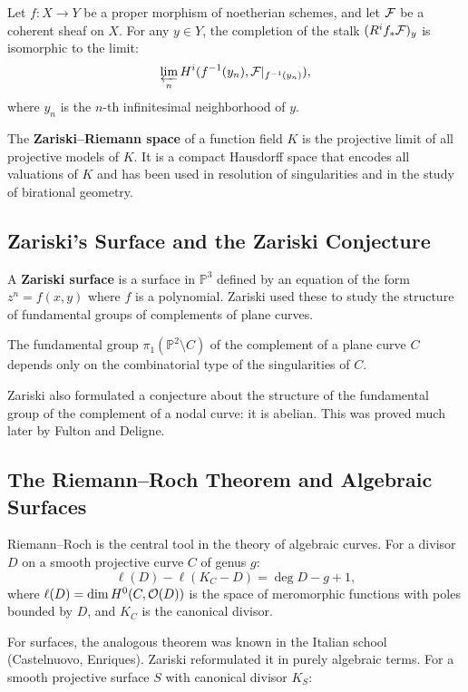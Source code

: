 \begin{theorem}
Let $f: X \to Y$ be a proper morphism of noetherian schemes, and let $\mathcal{F}$ be a coherent sheaf on $X$. For any $y \in Y$, the completion of the stalk $(R^i f_* \mathcal{F})_y$ is isomorphic to the limit:
\[
\varprojlim_n H^i(f^{-1}(y_n), \mathcal{F}|_{f^{-1}(y_n)}),
\]
where $y_n$ is the $n$-th infinitesimal neighborhood of $y$.
\end{theorem}

The \textbf{Zariski--Riemann space} of a function field $K$ is the projective limit of all projective models of $K$. It is a compact Hausdorff space that encodes all valuations of $K$ and has been used in resolution of singularities and in the study of birational geometry.

\subsection{Zariski's Surface and the Zariski Conjecture}

A \textbf{Zariski surface} is a surface in $\mathbb{P}^3$ defined by an equation of the form $z^n = f(x,y)$ where $f$ is a polynomial. Zariski used these to study the structure of fundamental groups of complements of plane curves.

\begin{theorem}
The fundamental group $\pi_1(\mathbb{P}^2 \setminus C)$ of the complement of a plane curve $C$ depends only on the combinatorial type of the singularities of $C$.
\end{theorem}

Zariski also formulated a conjecture about the structure of the fundamental group of the complement of a nodal curve: it is abelian. This was proved much later by Fulton and Deligne.

\subsection{The Riemann--Roch Theorem and Algebraic Surfaces}

Riemann--Roch is the central tool in the theory of algebraic curves. For a divisor $D$ on a smooth projective curve $C$ of genus $g$:
\[
\ell(D) - \ell(K_C - D) = \deg D - g + 1,
\]
where $\ell(D) = \dim H^0(C, \mathcal{O}(D))$ is the space of meromorphic functions with poles bounded by $D$, and $K_C$ is the canonical divisor.

For surfaces, the analogous theorem was known in the Italian school (Castelnuovo, Enriques). Zariski reformulated it in purely algebraic terms. For a smooth projective surface $S$ with canonical divisor $K_S$:

